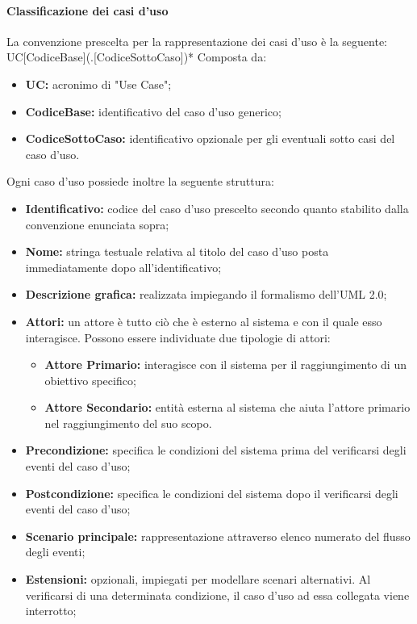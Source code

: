 \paragraph{Classificazione dei casi d'uso}
\label{Class_uso}
La convenzione prescelta per la rappresentazione dei casi d'uso è la seguente:
UC[CodiceBase](.[CodiceSottoCaso])*
Composta da:
\begin{itemize}
	\item \textbf{UC:} acronimo di "Use Case";
	\item \textbf{CodiceBase:} identificativo del caso d'uso generico;
	\item \textbf{CodiceSottoCaso:} identificativo opzionale per gli eventuali sotto casi del caso d'uso.
\end{itemize}
Ogni caso d'uso possiede inoltre la seguente struttura:
\begin{itemize}
	\item \textbf{Identificativo:} codice del caso d'uso prescelto secondo quanto stabilito dalla convenzione enunciata sopra;
	\item \textbf{Nome:} stringa testuale relativa al titolo del caso d'uso posta immediatamente dopo all'identificativo;
	\item \textbf{Descrizione grafica:} realizzata impiegando il formalismo dell'UML 2.0;
	\item \textbf{Attori:} un attore è tutto ciò che è esterno al sistema e con il quale esso interagisce. Possono essere individuate due tipologie di attori:
	\begin{itemize}
		\item \textbf{Attore Primario:} interagisce con il sistema per il raggiungimento di un obiettivo specifico;
		\item \textbf{Attore Secondario:} entità esterna al sistema che aiuta l'attore primario nel raggiungimento del suo scopo.
	\end{itemize}
	\item \textbf{Precondizione:} specifica le condizioni del sistema prima del verificarsi degli eventi del caso d'uso;
	\item \textbf{Postcondizione:} specifica le condizioni del sistema dopo il verificarsi degli eventi del caso d'uso;
	\item \textbf{Scenario principale:} rappresentazione attraverso elenco numerato del flusso degli eventi;
	\item \textbf{Estensioni:} opzionali, impiegati per modellare scenari alternativi. Al verificarsi di una determinata condizione, il caso d'uso ad essa collegata viene interrotto;
\end{itemize}
